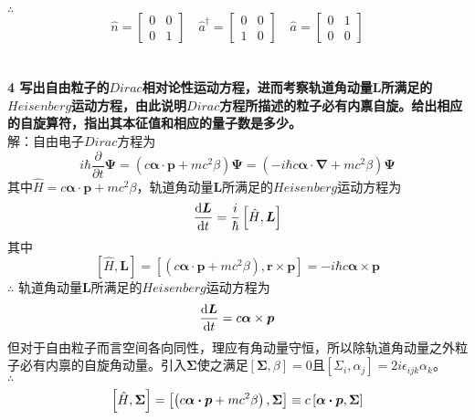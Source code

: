 \documentclass[12pt]{article}
\numberwithin{equation}{section}	 %
\begin{document}
\begin{spacing}{1.5}
$\therefore$
\begin{equation}\nonumber 		%
\hat{n}=\begin{bmatrix}
0 & 0\\
0 & 1
\end{bmatrix} \quad
\hat{a}^{\dag}=\begin{bmatrix}
0 & 0\\
1 & 0
\end{bmatrix} \quad
\hat{a}=\begin{bmatrix}
0 & 1\\
0 & 0
\end{bmatrix}
\end{equation}
~\\
~\\
\textbf{4 \quad 写出自由粒子的$Dirac$相对论性运动方程，进而考察轨道角动量$\bm{L}$所满足的$Heisenberg$运动方程，由此说明$Dirac$方程所描述的粒子必有内禀自旋。给出相应的自旋算符，指出其本征值和相应的量子数是多少。}\\
解：自由电子$Dirac$方程为
\begin{equation}
i\hbar\frac{\partial}{\partial t}\bm\Psi = \left(c\bm{\alpha \cdot p} +mc^{2}\beta\right)\bm\Psi = \left(-i\hbar c\bm{\alpha \cdot \nabla} +mc^{2}\beta\right)\bm\Psi
\end{equation}
其中$\hat{H} = c\bm{\alpha \cdot p} +mc^{2}\beta$，轨道角动量$\bm{L}$所满足的$Heisenberg$运动方程为
\begin{equation}
\frac{\mathop{}\!\mathrm{d} \bm{L}}{\mathop{}\!\mathrm{d} t} = \frac{i}{\hbar}\left[ \hat{H} , \bm{L} \right]
\end{equation}
其中
\begin{equation}
\left[ \hat{H} , \bm{L} \right] = \left[ \left( c\bm{\alpha \cdot p} +mc^{2}\beta \right) , \bm{r} \times \bm{p} \right] = -i\hbar c\bm{\alpha} \times \bm{p}
\end{equation}
$\therefore$ 轨道角动量$\bm{L}$所满足的$Heisenberg$运动方程为
\begin{equation}
\frac{\mathop{}\!\mathrm{d} \bm{L}}{\mathop{}\!\mathrm{d} t} = c\bm{\alpha} \times \bm{p}
\end{equation}
但对于自由粒子而言空间各向同性，理应有角动量守恒，所以除轨道角动量之外粒子必有内禀的自旋角动量。引入$\bm\Sigma$使之满足$\left[\bm\Sigma,\beta\right]=0$且$\left[\Sigma_{i},\alpha_{j}\right]=2i\epsilon_{ijk}\alpha_{k}$。\\
$\therefore$ 
\begin{align}
\left[ \hat{H} , \bm\Sigma \right] &= \left[ \left( c\bm{\alpha \cdot p} +mc^{2}\beta \right) , \bm\Sigma \right] \equiv c\left[ \bm{\alpha \cdot p} , \bm\Sigma \right] \notag \\

\end{align}
\end{spacing}
\end{document}
